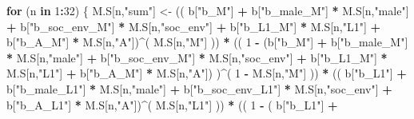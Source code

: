 \documentclass[
]{book}
\newenvironment{Shaded}{\begin{snugshade}}{\end{snugshade}}
\newcommand{\ControlFlowTok}[1]{\textcolor[rgb]{0.13,0.29,0.53}{\textbf{#1}}}
\newcommand{\DecValTok}[1]{\textcolor[rgb]{0.00,0.00,0.81}{#1}}
\newcommand{\NormalTok}[1]{#1}
\newcommand{\OtherTok}[1]{\textcolor[rgb]{0.56,0.35,0.01}{#1}}
\newcommand{\SpecialCharTok}[1]{\textcolor[rgb]{0.81,0.36,0.00}{\textbf{#1}}}
\newcommand{\StringTok}[1]{\textcolor[rgb]{0.31,0.60,0.02}{#1}}
\begin{document}
\begin{Shaded}
\begin{Highlighting}[]
  \ControlFlowTok{for}\NormalTok{ (n }\ControlFlowTok{in} \DecValTok{1}\SpecialCharTok{:}\DecValTok{32}\NormalTok{) \{}
\NormalTok{    M.S[n,}\StringTok{"sum"}\NormalTok{] }\OtherTok{\textless{}{-}}\NormalTok{ (( b[}\StringTok{"b\_M"}\NormalTok{] }\SpecialCharTok{+}                                                              
\NormalTok{                         b[}\StringTok{"b\_male\_M"}\NormalTok{] }\SpecialCharTok{*}\NormalTok{ M.S[n,}\StringTok{"male"}\NormalTok{] }\SpecialCharTok{+} 
\NormalTok{                         b[}\StringTok{"b\_soc\_env\_M"}\NormalTok{] }\SpecialCharTok{*}\NormalTok{ M.S[n,}\StringTok{"soc\_env"}\NormalTok{] }\SpecialCharTok{+} 
\NormalTok{                         b[}\StringTok{"b\_L1\_M"}\NormalTok{] }\SpecialCharTok{*}\NormalTok{ M.S[n,}\StringTok{"L1"}\NormalTok{] }\SpecialCharTok{+}
\NormalTok{                         b[}\StringTok{"b\_A\_M"}\NormalTok{] }\SpecialCharTok{*}\NormalTok{ M.S[n,}\StringTok{"A"}\NormalTok{])}\SpecialCharTok{\^{}}\NormalTok{( M.S[n,}\StringTok{"M"}\NormalTok{] )) }\SpecialCharTok{*}
\NormalTok{      (( }\DecValTok{1} \SpecialCharTok{{-}}\NormalTok{ (b[}\StringTok{"b\_M"}\NormalTok{] }\SpecialCharTok{+} 
\NormalTok{                b[}\StringTok{"b\_male\_M"}\NormalTok{] }\SpecialCharTok{*}\NormalTok{ M.S[n,}\StringTok{"male"}\NormalTok{] }\SpecialCharTok{+} 
\NormalTok{                b[}\StringTok{"b\_soc\_env\_M"}\NormalTok{] }\SpecialCharTok{*}\NormalTok{ M.S[n,}\StringTok{"soc\_env"}\NormalTok{] }\SpecialCharTok{+} 
\NormalTok{                b[}\StringTok{"b\_L1\_M"}\NormalTok{] }\SpecialCharTok{*}\NormalTok{ M.S[n,}\StringTok{"L1"}\NormalTok{] }\SpecialCharTok{+}
\NormalTok{                b[}\StringTok{"b\_A\_M"}\NormalTok{] }\SpecialCharTok{*}\NormalTok{ M.S[n,}\StringTok{"A"}\NormalTok{]) )}\SpecialCharTok{\^{}}\NormalTok{( }\DecValTok{1} \SpecialCharTok{{-}}\NormalTok{ M.S[n,}\StringTok{"M"}\NormalTok{] )) }\SpecialCharTok{*}
\NormalTok{      (( b[}\StringTok{"b\_L1"}\NormalTok{] }\SpecialCharTok{+}                                                           
\NormalTok{           b[}\StringTok{"b\_male\_L1"}\NormalTok{] }\SpecialCharTok{*}\NormalTok{ M.S[n,}\StringTok{"male"}\NormalTok{] }\SpecialCharTok{+}  
\NormalTok{           b[}\StringTok{"b\_soc\_env\_L1"}\NormalTok{] }\SpecialCharTok{*}\NormalTok{ M.S[n,}\StringTok{"soc\_env"}\NormalTok{] }\SpecialCharTok{+}
\NormalTok{           b[}\StringTok{"b\_A\_L1"}\NormalTok{] }\SpecialCharTok{*}\NormalTok{ M.S[n,}\StringTok{"A"}\NormalTok{])}\SpecialCharTok{\^{}}\NormalTok{( M.S[n,}\StringTok{"L1"}\NormalTok{] )) }\SpecialCharTok{*}
\NormalTok{      (( }\DecValTok{1} \SpecialCharTok{{-}}\NormalTok{ ( b[}\StringTok{"b\_L1"}\NormalTok{] }\SpecialCharTok{+}

\end{Highlighting}
\end{Shaded}
\end{document}
